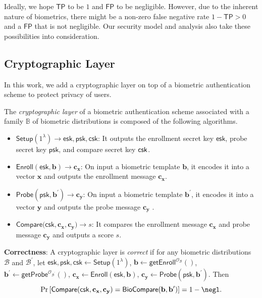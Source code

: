 Ideally, we hope $\mathsf{TP}$ to be $1$ and $\mathsf{FP}$ to be negligible. However, due to the inherent nature of biometrics, there might be a non-zero false negative rate $ 1 - \mathsf{TP} > 0$ and a $\mathsf{FP}$ that is not negligible. Our security model and analysis also take these possibilities into consideration.




\subsection{Cryptographic Layer}
\label{sec:formalization:cryptographic_layer}
In this work, we add a cryptographic layer on top of a biometric authentication scheme to protect privacy of users.

\begin{definition}

The \emph{cryptographic layer} of a biometric authentication scheme associated with a family $\mathbb{B}$ of biometric distributions is composed of the following algorithms.

\begin{itemize}

	\item $\mathsf{Setup}(1^\lambda) \to \mathsf{esk}, \mathsf{psk}, \mathsf{csk}$: It outputs the enrollment secret key $\mathsf{esk}$, probe secret key $\mathsf{psk}$, and compare secret key $\sf csk$.

	\item $\mathsf{Enroll}(\mathsf{esk}, \mathbf{b}) \to \mathbf{c_x}$: On input a biometric template $\mathbf{b}$, it encodes it into a vector $\mathbf{x}$ and outputs the enrollment message $\mathbf{c_x}$.
	
	\item $\mathsf{Probe}(\mathsf{psk}, \mathbf{b}^\prime) \to \mathbf{c_y}$: On input a biometric template $\mathbf{b}^\prime$, it encodes it into a vector $\mathbf{y}$ and outputs the probe message $\mathbf{c_y}$ .

	\item $\mathsf{Compare}(\mathsf{csk}, \mathbf{c_x}, \mathbf{c_y)} \to s$: It compares the enrollment message $\mathbf{c_x}$ and probe message $\mathbf{c_y}$ and outputs a score $s$.

\end{itemize}

\noindent \textbf{Correctness}: A cryptographic layer is \emph{correct} if for any biometric distributions $\mathcal{B}$ and $\mathcal{B}^\prime$, let $\mathsf{esk}, \mathsf{psk}, \mathsf{csk} \gets \mathsf{Setup}(1^\lambda)$, $\mathbf{b} \gets \mathsf{getEnroll}^{\mathcal{O}_\mathcal{B}}()$, $\mathbf{b}^\prime \gets \mathsf{getProbe}^{\mathcal{O}_{\mathcal{B}^\prime}}()$, $\mathbf{c_x} \gets \mathsf{Enroll}(\mathsf{esk}, \mathbf{b})$, $\mathbf{c_y} \gets \mathsf{Probe}(\mathsf{psk}, \mathbf{b}^\prime)$. Then
	\[
		\Pr \left [
			\mathsf{Compare}(\mathsf{csk}, \mathbf{c_x}, \mathbf{c_y}) = \mathsf{BioCompare}(\mathbf{b}, \mathbf{b}^\prime)
		\right ] = 1 - \negl.
	\]

\end{definition}

